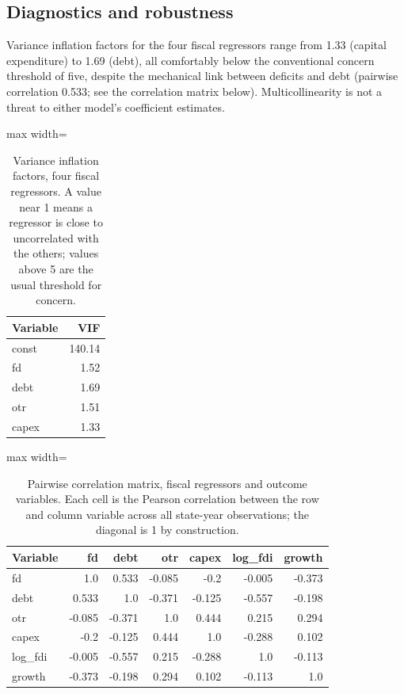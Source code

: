 \documentclass[12pt,a4paper]{article}
\begin{document}
\subsection{Diagnostics and robustness}

Variance inflation factors for the four fiscal regressors range from 1.33 (capital expenditure) to 1.69 (debt), all comfortably below the conventional concern threshold of five, despite the mechanical link between deficits and debt (pairwise correlation 0.533; see the correlation matrix below). Multicollinearity is not a threat to either model's coefficient estimates.

\begin{table}[H]
\centering
\caption{Variance inflation factors, four fiscal regressors. A value near 1 means a regressor is close to uncorrelated with the others; values above 5 are the usual threshold for concern.}
\label{tab:21}
\footnotesize
\begin{adjustbox}{max width=\textwidth}
\begin{tabular}{@{}lr@{}}
\toprule
Variable & VIF \\
\midrule
const & 140.14 \\
fd & 1.52 \\
debt & 1.69 \\
otr & 1.51 \\
capex & 1.33 \\
\bottomrule
\end{tabular}
\end{adjustbox}
\end{table}

\begin{table}[H]
\centering
\caption{Pairwise correlation matrix, fiscal regressors and outcome variables. Each cell is the Pearson correlation between the row and column variable across all state-year observations; the diagonal is 1 by construction.}
\label{tab:22}
\footnotesize
\begin{adjustbox}{max width=\textwidth}
\begin{tabular}{@{}lrrrrrr@{}}
\toprule
Variable & fd & debt & otr & capex & log\_fdi & growth \\
\midrule
fd & 1.0 & 0.533 & -0.085 & -0.2 & -0.005 & -0.373 \\
debt & 0.533 & 1.0 & -0.371 & -0.125 & -0.557 & -0.198 \\
otr & -0.085 & -0.371 & 1.0 & 0.444 & 0.215 & 0.294 \\
capex & -0.2 & -0.125 & 0.444 & 1.0 & -0.288 & 0.102 \\
log\_fdi & -0.005 & -0.557 & 0.215 & -0.288 & 1.0 & -0.113 \\
growth & -0.373 & -0.198 & 0.294 & 0.102 & -0.113 & 1.0 \\
\bottomrule
\end{tabular}
\end{adjustbox}
\end{table}
\end{document}
